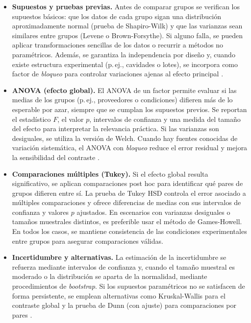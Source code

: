 \begin{itemize}
  \item \textbf{Supuestos y pruebas previas.}
  Antes de comparar grupos se verifican los supuestos básicos: que los datos de cada grupo sigan una
  distribución aproximadamente normal (prueba de Shapiro-Wilk) y que las varianzas sean similares entre
  grupos (Levene o Brown-Forsythe). Si alguno falla, se pueden aplicar transformaciones sencillas de los
  datos o recurrir a métodos no paramétricos. Además, se garantiza la independencia por diseño y, cuando
  existe estructura experimental (p.\,ej., cavidades o lotes), se incorpora como factor de
  \emph{bloqueo} para controlar variaciones ajenas al efecto principal \cite{Fischer2020,Liu2021}.

  \item \textbf{ANOVA (efecto global).}
  El ANOVA de un factor permite evaluar si las medias de los grupos (p.\,ej., proveedores o condiciones)
  difieren más de lo esperable por azar, siempre que se cumplan los supuestos previos. Se reportan el
  estadístico \(F\), el valor \(p\), intervalos de confianza y una medida del tamaño del efecto para
  interpretar la relevancia práctica. Si las varianzas son desiguales, se utiliza la versión de Welch.
  Cuando hay fuentes conocidas de variación sistemática, el ANOVA con \emph{bloqueo} reduce el error
  residual y mejora la sensibilidad del contraste \cite{Liu2021}.

  \item \textbf{Comparaciones múltiples (Tukey).}
  Si el efecto global resulta significativo, se aplican comparaciones post hoc para identificar qué
  pares de grupos difieren entre sí. La prueba de Tukey HSD controla el error asociado a múltiples
  comparaciones y ofrece diferencias de medias con sus intervalos de confianza y valores \(p\)
  ajustados. En escenarios con varianzas desiguales o tamaños muestrales distintos, es preferible usar
  el método de Games-Howell. En todos los casos, se mantiene consistencia de las condiciones
  experimentales entre grupos para asegurar comparaciones válidas.

  \item \textbf{Incertidumbre y alternativas.}
  La estimación de la incertidumbre se refuerza mediante intervalos de confianza y, cuando el tamaño
  muestral es moderado o la distribución se aparta de la normalidad, mediante procedimientos de
  \emph{bootstrap}. Si los supuestos paramétricos no se satisfacen de forma persistente, se emplean
  alternativas como Kruskal-Wallis para el contraste global y la prueba de Dunn (con ajuste) para
  comparaciones por pares \cite{Fischer2020}.


\end{itemize}
